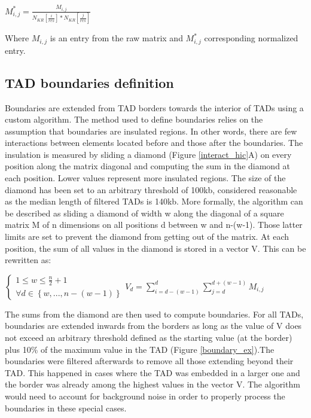 \documentclass[11pt,a4paper]{report}
\begin{document}
\vspace{0.2in}
$M^*_{i,j}=\frac{M_{i,j}}{N_{KR}[\frac{i}{res}]*N_{KR}[\frac{j}{res}]}$
\vspace{0.2in}

\noindent Where $M_{i,j}$ is an entry from the raw matrix and $M^*_{i,j}$ corresponding normalized entry.

\subsection*{TAD boundaries definition}

Boundaries are extended from TAD borders towards the interior of TADs using a custom algorithm. The method used to define boundaries relies on the assumption that boundaries are insulated regions. In other words, there are few interactions between elements located before and those after the boundaries. The insulation is measured by sliding a diamond (Figure \ref{interact_hic}A) on every position along the matrix diagonal and computing the sum in the diamond at each position. Lower values represent more insulated regions. The size of the diamond has been set to an arbitrary threshold of 100kb, considered reasonable as the median length of filtered TADs is 140kb. 
More formally, the algorithm can be described as sliding a diamond of width w  along the diagonal of a square matrix M of n dimensions on all positions d between w and n-(w-1). Those latter limits are set to prevent the diamond from getting out of the matrix. At each position, the sum of all values in the diamond is stored in a vector V. This can be rewritten as: 

\vspace{0.2in}
$\left\{\begin{matrix}1\leq w\leq \frac{n}{2}+1 \\ \forall d\in\left \{ w , ... , n-\left ( w-1 \right ) \right \}\end{matrix}\right. V_{d}=\sum_{i=d-(w-1)}^{d}\sum_{j=d}^{d+(w-1)}M_{i,j}$
\vspace{0.2in}

\noindent The sums from the diamond are then used to compute boundaries. For all TADs, boundaries are extended inwards from the borders as long as the value of V does not exceed an arbitrary threshold defined as the starting value (at the border) plus 10\% of the maximum value in the TAD (Figure \ref{boundary_ex}).The boundaries were filtered afterwards to remove all those extending beyond their TAD. This happened in cases where the TAD was embedded in a larger one and the border was already among the highest values in the vector V. The algorithm would need to account for background noise in order to properly process the boundaries in these special cases.
\end{document}
